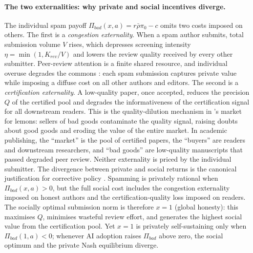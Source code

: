 \documentclass{article}
\begin{document}
\paragraph{The two externalities: why private and social incentives diverge.}
The individual spam payoff $\Pi_{bad}(x,a) = r\bar{\rho}\pi_0 - c$ omits two costs imposed on others.
The first is a \emph{congestion externality}.
When a spam author submits, total submission volume $V$ rises, which depresses screening intensity $\eta = \min(1, K_{rev}/V)$ and lowers the review quality received by every other submitter.
Peer-review attention is a finite shared resource, and individual overuse degrades the commons \citep{Ostrom1990}: each spam submission captures private value while imposing a diffuse cost on all other authors and editors.
The second is a \emph{certification externality}.
A low-quality paper, once accepted, reduces the precision $Q$ of the certified pool and degrades the informativeness of the certification signal for all downstream readers.
This is the quality-dilution mechanism in \citet{Akerlof1970}'s market for lemons: sellers of bad goods contaminate the quality signal, raising doubts about good goods and eroding the value of the entire market.
In academic publishing, the ``market'' is the pool of certified papers, the ``buyers'' are readers and downstream researchers, and ``bad goods'' are low-quality manuscripts that passed degraded peer review.
Neither externality is priced by the individual submitter.
The divergence between private and social returns is the canonical justification for corrective policy \citep{Pigou1920}.
Spamming is privately rational when $\Pi_{bad}(x,a) > 0$, but the full social cost includes the congestion externality imposed on honest authors and the certification-quality loss imposed on readers.
The socially optimal submission norm is therefore $x = 1$ (global honesty): this maximises $Q$, minimises wasteful review effort, and generates the highest social value from the certification pool.
Yet $x = 1$ is privately self-sustaining only when $\Pi_{bad}(1,a) < 0$; whenever AI adoption raises $\Pi_{bad}$ above zero, the social optimum and the private Nash equilibrium diverge.
\end{document}
